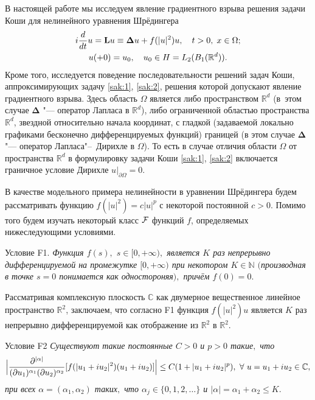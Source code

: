 В настоящей работе мы исследуем явление градиентного взрыва решения задачи Коши для
нелинейного уравнения Шрёдингера
\begin{gather}
i{d\over {dt}}u={\bf L}u\equiv {\bf \Delta }u+f(|u|^2)u ,\quad  t>0,\; x\in \Omega ;
\label{sak:1}
\\
u(+0)=u_{0},\quad  u_{0}\in H=L_{2}(B_{1}(\mathbb R^{d})).
\label{sak:2}
\end{gather}
Кроме того, исследуется поведение последовательности решений задач Коши, аппроксимирующих задачу \eqref{sak:1}, \eqref{sak:2}, решения которой допускают явление градиентного взрыва.
Здесь область $\Omega $ является либо пространством $\mathbb R^{d}$ (в~этом
случае $\boldsymbol \Delta $ "--- оператор Лапласа в $\mathbb R^{d}$),  либо ограниченной областью
пространства $\mathbb R^{d}$, звездной относительно начала координат, с гладкой (задаваемой локально графиками бесконечно дифференцируемых функций) границей (в этом случае $\boldsymbol \Delta $ "--- оператор Лапласа"--~Дирихле в $\Omega $). То есть в случае отличия области $\Omega $ от пространства $\mathbb R^d$ в формулировку задачи Коши \eqref{sak:1}, \eqref{sak:2} включается граничное условие Дирихле $u|_{\partial\Omega }=0$.

В качестве модельного примера нелинейности в уравнении Шрёдингера
будем рассматривать функцию $f(|u|^2)=c|u|^{p}$ с некоторой
постоянной $c>0$. Помимо того будем изучать некоторый класс $\cal F$ функций $f$, определяемых нижеследующими условиями.

\smallskip

{\small \sc Условие F1.} {\it Функция  $f(s),$ $s\in [0,+\infty ),$ является $K$ раз непрерывно дифференцируемой на промежутке $[0,+\infty )$ при некотором $K\in \mathbb N$ $($производная в точке $s=0$ понимается как одностороняя$),$ причём $f(0)=0.$}

\smallskip

Рассматривая комплексную плоскость $\mathbb C$ как двумерное
вещественное линейное пространство $\mathbb R^{2}$, заключаем, что согласно {\sc F1} функция
$f(|u|^2)u$ является $K$ раз непрерывно дифференцируемой как отображение из $\mathbb R^{2}$ в $\mathbb R^{2}$. 

\smallskip

{\small \sc Условие F2}  {\it  Существуют такие постоянные $C>0$ и $p>0$ такие$,$ что
$$
\Bigl|\frac{\partial ^{|\alpha |}}{(\partial u_{1})^{\alpha_{1}}(\partial u_{2})^{\alpha
_{2}}}[f(|u_1+iu_2|^2)(u_1+iu_2)]\Bigr|\leq C(1+|u_1+iu_2|^{p}),\ \forall \ u=u_1+iu_2\in {\mathbb C},
$$
при всех $\alpha =(\alpha _{1},\alpha _{2})$ таких$,$ что $\alpha _{j}\in \{
0, 1, 2, \dots\}$ и $|\alpha|=\alpha_{1}+\alpha_{2} \leq K.$}

